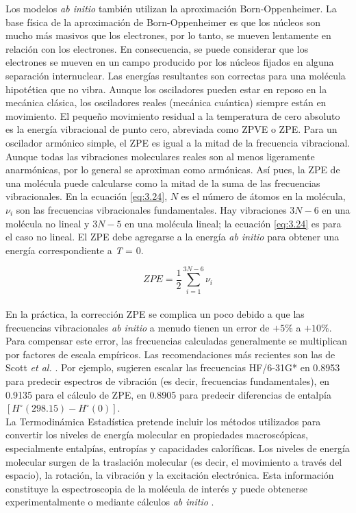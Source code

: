 Los modelos \textit{ab initio} también  utilizan la aproximación Born-Oppenheimer. La base física de la aproximación de Born-Oppenheimer es que los núcleos son mucho más masivos que los electrones, por lo tanto, se mueven lentamente en relación con los electrones. En consecuencia, se puede considerar que los electrones se mueven en un campo producido por los núcleos fijados en alguna separación internuclear. Las energías resultantes son correctas para una molécula hipotética que no vibra. Aunque los osciladores pueden estar en reposo en la mecánica clásica, los osciladores reales (mecánica cuántica) siempre están en movimiento. El pequeño movimiento residual a la temperatura de cero absoluto es la energía vibracional de punto cero, abreviada como ZPVE o ZPE. Para un oscilador armónico simple, el ZPE es igual a la mitad de la frecuencia vibracional. Aunque todas las vibraciones moleculares reales son al menos ligeramente anarmónicas, por lo general se aproximan como armónicas. Así pues, la ZPE de una molécula puede calcularse como la mitad de la suma de las frecuencias vibracionales. En la ecuación \ref{eq:3.24}, $N$ es el número de átomos en la molécula, $\nu _{i}$ son las frecuencias vibracionales fundamentales. Hay vibraciones $3N-6$ en una molécula no lineal y $3N-5$ en una molécula lineal; la ecuación \ref{eq:3.24} es para el caso no lineal. El ZPE debe agregarse a la energía \textit{ab initio} para obtener una energía correspondiente a \textit{T} = 0.

\begin{equation}
ZPE = \frac{1}{2} \sum_{i=1}^{3N-6} \nu_{i}
\label{eq:3.24}
\end{equation}\\

En la práctica, la corrección ZPE se complica un poco debido a que las
frecuencias vibracionales \textit{ab initio} a menudo tienen un error de $+5\%$ a $+10\%$. Para compensar este error, las frecuencias calculadas generalmente se multiplican por factores de escala empíricos. Las recomendaciones más recientes son las de Scott \textit{et al.} \cite{Scott1996}. Por ejemplo, sugieren escalar las frecuencias HF/6-31G* en 0.8953 para predecir espectros de vibración (es decir, frecuencias fundamentales), en 0.9135 para el cálculo de ZPE, en 0.8905 para predecir diferencias de entalpía $[H^{\circ}(298.15) - H^{\circ}(0)]$.\\

La Termodinámica Estadística pretende incluir los métodos utilizados para convertir los niveles de energía molecular en propiedades macroscópicas, especialmente entalpías, entropías y capacidades caloríficas. Los niveles de energía molecular surgen de la traslación molecular (es decir, el movimiento a través del espacio), la rotación, la vibración y la excitación electrónica. Esta información constituye la espectroscopia de la molécula de interés y puede obtenerse experimentalmente o mediante cálculos \textit{ab initio} \cite{Irikura1998}. \\

